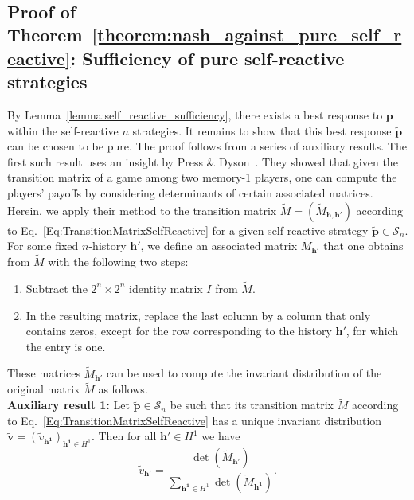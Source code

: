 \documentclass[9pt,twoside,lineno]{pnas-new}
\theoremstyle{plainCl1}
\theoremstyle{plainCl2}
\begin{document}
~





\subsection{Proof of Theorem~\ref{theorem:nash_against_pure_self_reactive}: Sufficiency of pure self-reactive strategies}

By Lemma~\ref{lemma:self_reactive_sufficiency}, there exists a best response to $\mathbf{p}$ within the self-reactive $n$ strategies. 
It remains to show that this best response $\mathbf{\tilde p}$ can be chosen to be pure. 
The proof follows from a series of auxiliary results. 
The first such result uses an insight by Press \& Dyson~\citep{press:PNAS:2012}. 
They showed that given the transition matrix of a game among two memory-1 players, one can compute the players' payoffs by considering determinants of certain associated matrices. 
Herein, we apply their method to the transition matrix $\tilde M\!=\!(\tilde M_{\mathbf{h},\mathbf{h'}})$ according to Eq.~\eqref{Eq:TransitionMatrixSelfReactive} for a given self-reactive strategy $\mathbf{\tilde p}\!\in\!\mathcal{S}_n$. 
For some fixed $n$-history $\mathbf{h'}$, we define an associated matrix $\tilde M_\mathbf{h'}$ that one obtains from  $\tilde M$ with the following two steps:
\begin{enumerate}
\item Subtract the $2^n\!\times\!2^n$ identity matrix $I$ from $\tilde M$. 
\item In the resulting matrix, replace the last column by a column that only contains zeros, except for the row corresponding to the history $\mathbf{h'}$, for which the entry is one. 
\end{enumerate}
These matrices $\tilde M_\mathbf{h'}$ can be used to compute the invariant distribution of the original matrix $\tilde M$ as follows.\\

\noindent
{\bf Auxiliary result 1:}
Let $\mathbf{\tilde p}\!\in\!\mathcal{S}_n$ be such that its transition matrix $\tilde M$ according to Eq.~\eqref{Eq:TransitionMatrixSelfReactive} has a unique invariant distribution $\mathbf{\tilde v} \!=\! (\tilde v_\mathbf{h^1})_{\mathbf{h^1}\in H^1}$. Then for all $\mathbf{h'}\!\in\!H^1$ we have
\begin{equation} \label{Eq:PDFormula}
\tilde v_\mathbf{h'} = \frac{ \det(\tilde M_{\mathbf{h'}})}{ \sum_{\mathbf{h^1}\in H^1} \det(\tilde M_{\mathbf{h^1}})}.
\end{equation}
\end{document}
